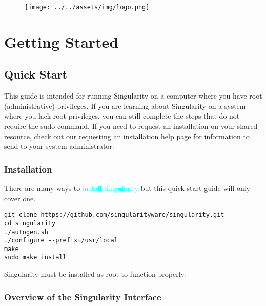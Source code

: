 \documentclass[a4paper]{article}
\date{\vspace{-5ex}}
\begin{document}
\begin{figure}
\centering
{\texttt{[image: ../../assets/img/logo.png]}}
\end{figure}

\justify


\section{Getting Started}
\subsection{Quick Start}
\label{sec:quickstart}

This guide is intended for running Singularity on a computer where you have root (administrative) privileges. If you are learning about Singularity on a system where you lack root privileges, you can still complete the steps that do not require the sudo command. If you need to request an installation on your shared resource, check out our requesting an installation help page for information to send to your system administrator.

\newpage


\tableofcontents
\newpage

\subsubsection{Installation}

There are many ways to \hyperref[sec:installation]{{\textcolor{cyan}{install Singularity}}} but this quick start guide will only cover one.
\\[0.1in]


\lstset{language=bash}          %
\lstset{basicstyle = \ttfamily,columns=fullflexible}

\begin{lstlisting}[frame=single]  
git clone https://github.com/singularityware/singularity.git
cd singularity
./autogen.sh
./configure --prefix=/usr/local
make
sudo make install
\end{lstlisting}

Singularity must be installed as root to function properly.

\subsubsection{Overview of the Singularity Interface}
\end{document}
